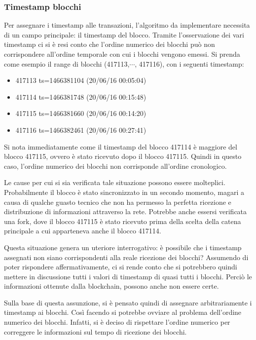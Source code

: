 \subsubsection{Timestamp blocchi}
Per assegnare i timestamp alle transazioni, l'algoritmo da implementare necessita di un campo principale: il timestamp del blocco. Tramite l'osservazione dei vari timestamp ci si è resi conto che l'ordine numerico dei blocchi può non corrispondere all'ordine temporale con cui i blocchi vengono emessi.
Si prenda come esempio il range di blocchi (417113,$\cdots$, 417116), con i seguenti timestamp:
\begin{itemize}
	\item 417113 ts=1466381104 (20/06/16 00:05:04)
	\item 417114 ts=1466381748 (20/06/16 00:15:48)
	\item 417115 ts=1466381660 (20/06/16 00:14:20)
	\item 417116 ts=1466382461 (20/06/16 00:27:41)
\end{itemize} 
Si nota immediatamente come il timestamp del blocco 417114 è maggiore del blocco 417115, ovvero è stato ricevuto dopo il blocco 417115. Quindi in questo caso, l'ordine numerico dei blocchi non corrisponde all'ordine cronologico. 

Le cause per cui si sia verificata tale situazione possono essere molteplici. Probabilmente il blocco è stato sincronizzato in un secondo momento, magari a causa di qualche guasto tecnico che non ha permesso la perfetta ricezione e distribuzione di informazioni attraverso la rete. Potrebbe anche essersi verificata una fork, dove il blocco 417115 è stato ricevuto prima della scelta della catena principale a cui apparteneva anche il blocco 417114.

Questa situazione genera un uteriore interrogativo: è possibile che i timestamp assegnati non siano corrispondenti alla reale ricezione dei blocchi? Assumendo di poter rispondere affermativamente, ci si rende conto che si potrebbero quindi mettere in discussione tutti i valori di timestamp di quasi tutti i blocchi. Perciò le informazioni ottenute dalla blockchain, possono anche non essere certe.

Sulla base di questa assunzione, si è pensato quindi di assegnare arbitrariamente i timestamp ai blocchi. Così facendo si potrebbe ovviare al problema dell'ordine numerico dei blocchi. Infatti, si è deciso di rispettare l'ordine numerico per correggere le informazioni sul tempo di ricezione dei blocchi.

